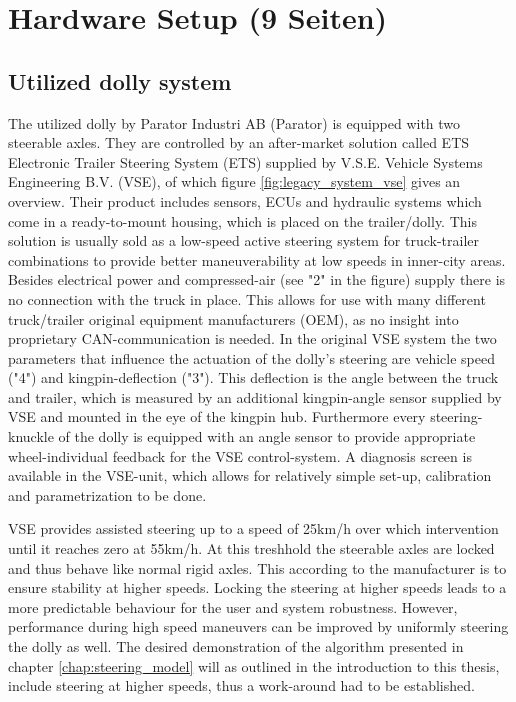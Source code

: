 \documentclass[ExampleMasters.tex]{subfiles}
\begin{document}
\clearpage


\chapter{Hardware Setup (9 Seiten)}
\label{chap:hardware_setup}
\section{Utilized dolly system}
\label{sec:dolly_system}
The utilized dolly by Parator Industri AB (Parator) is equipped with two steerable axles. They are controlled by an after-market solution called ETS Electronic Trailer Steering System (ETS) supplied by V.S.E. Vehicle Systems Engineering B.V. (VSE), of which figure \ref{fig:legacy_system_vse} gives an overview. Their product includes sensors, ECUs and hydraulic systems which come in a ready-to-mount housing, which is placed on the trailer/dolly. This solution is usually sold as a low-speed active steering system for truck-trailer combinations to provide better maneuverability at low speeds in inner-city areas. Besides electrical power and compressed-air (see "2" in the figure) supply there is no connection with the truck in place. This allows for use with many different truck/trailer original equipment manufacturers (OEM), as no insight into proprietary CAN-communication is needed. In the original VSE system the two parameters that influence the actuation of the dolly's steering are vehicle speed ("4") and kingpin-deflection ("3"). This deflection is the angle between the truck and trailer, which is measured by an additional kingpin-angle sensor supplied by VSE and mounted in the eye of the kingpin hub. Furthermore every steering-knuckle of the dolly is equipped with an angle sensor to provide appropriate wheel-individual feedback for the VSE control-system. A diagnosis screen is available in the VSE-unit, which allows for relatively simple set-up, calibration and parametrization to be done.\cite{dolly_datasheet}

VSE provides assisted steering up to a speed of 25km/h over which intervention until it reaches zero at 55km/h. At this treshhold the steerable axles are locked and thus behave like normal rigid axles. This according to the manufacturer is to ensure stability at higher speeds.\cite{dolly_datasheet} Locking the steering at higher speeds leads to a more predictable behaviour for the user and system robustness. However, performance during high speed maneuvers can be improved by uniformly steering the dolly as well.\cite{performance_improvement} The desired demonstration of the algorithm presented in chapter \ref{chap:steering_model} will as outlined in the introduction to this thesis, include steering at higher speeds, thus a work-around had to be established.
\end{document}
